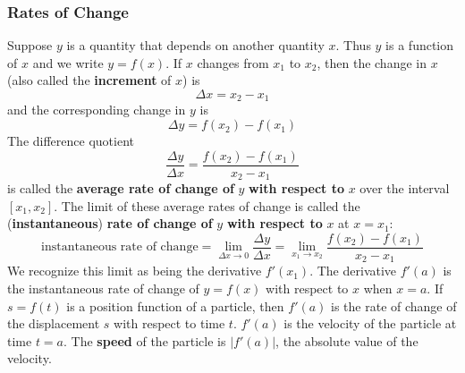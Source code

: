\subsubsection*{Rates of Change}
Suppose \(y\) is a quantity that depends on another quantity \(x\).
Thus \(y\) is a function of \(x\) and we write \(y=f(x)\).
If \(x\) changes from \(x_1\) to \(x_2\),
then the change in \(x\) (also called the \textbf{increment} of \(x\)) is
\[\Delta x=x_2-x_1\]
and the corresponding change in \(y\) is
\[\Delta y=f(x_2)-f(x_1)\]
The difference quotient
\[\frac{\Delta y}{\Delta x}=\frac{f(x_2)-f(x_1)}{x_2-x_1}\]
is called the
\textbf{average rate of change of} \(y\) \textbf{with respect to} \(x\) over
the interval \([x_1,x_2]\).
The limit of these average rates of change is called the
(\textbf{instantaneous})
\textbf{rate of change of} \(y\) \textbf{with respect to} \(x\)
at \(x=x_1\):
\[\text{instantaneous rate of change}
=\lim_{\Delta x\to 0}\frac{\Delta y}{\Delta x}
=\lim_{x_1\to x_2}\frac{f(x_2)-f(x_1)}{x_2-x_1}\]
We recognize this limit as being the derivative \(f'(x_1)\).
The derivative \(f'(a)\) is the instantaneous rate of change of \(y=f(x)\)
with respect to \(x\) when \(x=a\).
If \(s=f(t)\) is a position function of a particle,
then \(f'(a)\) is the rate of change of the displacement \(s\) with respect to
time \(t\).
\(f'(a)\) is the velocity of the particle at time \(t=a\).
The \textbf{speed} of the particle is \(|f'(a)|\),
the absolute value of the velocity.